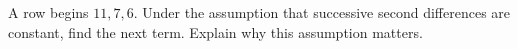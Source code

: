 A row begins $11,7,6$. Under the assumption that successive second differences are constant, find the next term. Explain why this assumption matters.
